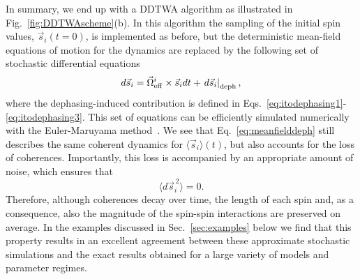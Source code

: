 \documentclass[pra,twocolumn,showpacs,preprintnumbers,amsmath,amssymb,superscriptaddress]{revtex4-1}
\begin{document}
In summary, we end up with a DDTWA algorithm as illustrated in Fig.~\ref{fig:DDTWAscheme}(b). In this algorithm the sampling of the  initial spin values, $\vec s_i(t=0)$, is implemented as before, but the deterministic mean-field equations of motion for the dynamics are replaced by the following set of stochastic differential equations 
\begin{equation}
d\vec s_i = \vec \Omega_{\rm eff}^i \times \vec s_i  dt +  \left.d\vec s_i\right|_{\rm deph},
\label{eq:meanfielddeph}
\end{equation} 
where the dephasing-induced contribution is defined in Eqs.~\eqref{eq:itodephasing1}-\eqref{eq:itodephasing3}. This set of equations can be
efficiently simulated numerically with the Euler-Maruyama method~\cite{Gardiner}. We see that  Eq.~\eqref{eq:meanfielddeph} still describes the same coherent dynamics for $\langle \vec s_i\rangle(t)$, but also accounts for the loss of coherences.  Importantly, this loss is accompanied by an appropriate amount of noise, which ensures that~\cite{footnote}
\begin{equation}
\langle d \vec s^{\,2}_i \rangle = 0. 
\label{eq:spinlengths}
\end{equation}
Therefore, although coherences decay over time, the length of each spin and, as a consequence, also the magnitude of the spin-spin interactions are preserved on average.  In the examples discussed  in Sec.~\ref{sec:examples} below we find that this property results in an excellent agreement between these approximate stochastic simulations and the exact results obtained for a large variety of models and parameter regimes.  
\end{document}
